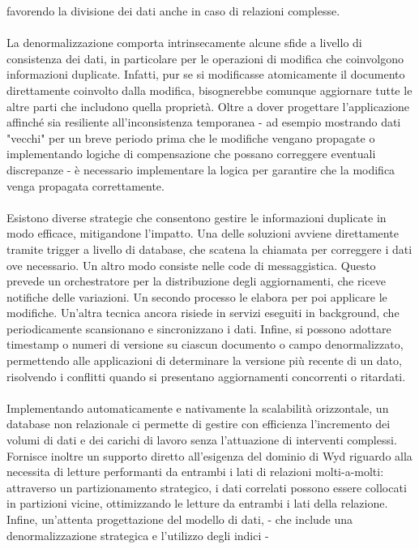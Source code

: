 favorendo la divisione dei dati anche in caso di relazioni complesse.\\
\\
La denormalizzazione comporta intrinsecamente
alcune sfide a livello di consistenza dei dati,
in particolare per le operazioni di modifica che coinvolgono informazioni duplicate.
Infatti, pur se si modificasse atomicamente il documento direttamente coinvolto dalla modifica,
bisognerebbe comunque aggiornare tutte le altre parti che includono quella proprietà.
Oltre a dover progettare l'applicazione affinché sia resiliente all'inconsistenza temporanea - ad esempio mostrando dati "vecchi" per un breve periodo prima che le modifiche vengano propagate
o implementando logiche di compensazione che possano correggere eventuali discrepanze -
è necessario implementare la logica per garantire che la modifica venga propagata correttamente.\\
\\
Esistono diverse strategie che consentono gestire le informazioni duplicate
in modo efficace, mitigandone l'impatto.
Una delle soluzioni avviene direttamente tramite trigger a livello di database,
che scatena la chiamata per correggere i dati ove necessario.
Un altro modo consiste nelle code di messaggistica.
Questo prevede un orchestratore per la distribuzione degli aggiornamenti,
che riceve notifiche delle variazioni.
Un secondo processo le elabora per poi applicare le modifiche.
Un'altra tecnica ancora risiede in servizi eseguiti in background,
che periodicamente scansionano e sincronizzano i dati.
Infine, si possono adottare timestamp o numeri di versione
su ciascun documento o campo denormalizzato,
permettendo alle applicazioni di determinare la versione più recente di un dato,
risolvendo i conflitti quando si presentano aggiornamenti concorrenti o ritardati.\\
\\
Implementando automaticamente e nativamente la scalabilità orizzontale,
un database non relazionale ci permette di gestire con efficienza
l'incremento dei volumi di dati e dei carichi di lavoro 
senza l'attuazione di interventi complessi.
Fornisce inoltre un supporto diretto all'esigenza del dominio di Wyd
riguardo alla necessita di letture performanti
da entrambi i lati di relazioni molti-a-molti:
attraverso un partizionamento strategico,
i dati correlati possono essere collocati in partizioni vicine,
ottimizzando le letture da entrambi i lati della relazione.
Infine, un'attenta progettazione del modello di dati,
- che include una denormalizzazione strategica e l'utilizzo degli indici -

